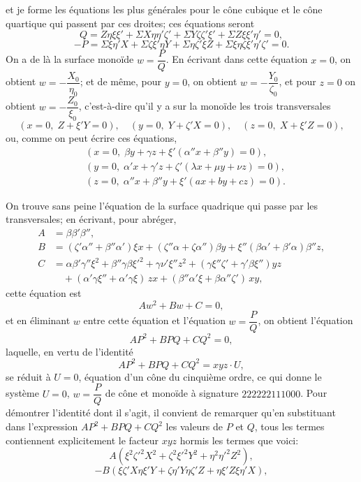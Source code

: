 \documentclass[11pt,a4paper]{article}
\begin{document}
\noindent et je forme les \'{e}quations les plus g\'{e}n\'{e}rales pour le c\^{o}ne cubique et le c\^{o}ne quartique qui passent par ces droites; ces \'{e}quations seront
\[
Q = Z\eta\xi\xi' + \Sigma X\eta\eta'\zeta' + \Sigma Y\zeta\zeta'\xi' + \Sigma Z\xi\xi'\eta' = 0,
\]
\[
-P = \Sigma\xi\eta'X + \Sigma\zeta\xi'\eta Y + \Sigma\eta\zeta'\xi Z + \Sigma\xi\eta\zeta\xi'\eta'\zeta' = 0.
\]
On a de l\`{a} la surface mono\"{i}de $w=\dfrac{P}{Q}$. En \'{e}crivant dans cette \'{e}quation $x=0$, on obtient $w=-\dfrac{X_0}{\eta_0}$; et de m\^{e}me, pour $y=0$, on obtient $w=-\dfrac{Y_0}{\zeta_0}$, et pour $z=0$ on obtient $w=-\dfrac{Z_0}{\xi_0}$, c'est-\`{a}-dire qu'il y a sur la mono\"{i}de les trois transversales
\[
(x=0,\; Z+\xi'Y=0), \quad (y=0,\; Y+\zeta'X=0), \quad (z=0,\; X+\xi'Z=0),
\]
ou, comme on peut \'{e}crire ces \'{e}quations,
\begin{align*}
&(x=0,\; \beta y+\gamma z+\xi'(\alpha''x+\beta''y)=0), \\
&(y=0,\; \alpha'x+\gamma'z+\zeta'(\lambda x+\mu y+\nu z)=0), \\
&(z=0,\; \alpha''x+\beta''y+\xi'(ax+by+cz)=0).
\end{align*}

\medskip

\noindent On trouve sans peine l'\'{e}quation de la surface quadrique qui passe par les transversales; en \'{e}crivant, pour abr\'{e}ger,
\begin{align*}
A &= \beta\beta'\beta'', \\
B &= (\zeta'\alpha''+\beta''\alpha')\xi x+(\zeta''\alpha+\zeta\alpha'')\beta y+\xi''(\beta\alpha'+\beta'\alpha)\beta''z, \\
C &= \alpha\beta'\gamma''\xi^2+\beta''\gamma\beta\xi'^2+\gamma\nu'\xi''z^2+(\gamma\xi''\zeta'+\gamma'\beta\xi'')yz \\
  &\quad +(\alpha'\gamma\xi''+\alpha'\gamma\xi)\,zx+(\beta''\alpha'\xi+\beta\alpha''\zeta')\,xy,
\end{align*}
cette \'{e}quation est
\[
Aw^2+Bw+C=0,
\]
et en \'{e}liminant $w$ entre cette \'{e}quation et l'\'{e}quation $w=\dfrac{P}{Q}$, on obtient l'\'{e}quation
\[
AP^2+BPQ+CQ^2=0,
\]
laquelle, en vertu de l'identit\'{e}
\[
AP^2+BPQ+CQ^2=xyz\cdot U,
\]
se r\'{e}duit \`{a} $U=0$, \'{e}quation d'un c\^{o}ne du cinqui\`{e}me ordre, ce qui donne le syst\`{e}me $U=0$, $w=\dfrac{P}{Q}$ de c\^{o}ne et mono\"{i}de \`{a} signature $222222111000$. Pour d\'{e}montrer l'identit\'{e} dont il s'agit, il convient de remarquer qu'en substituant dans l'expression $AP^2+BPQ+CQ^2$ les valeurs de $P$ et $Q$, tous les termes contiennent explicitement le facteur $xyz$ hormis les termes que voici:
\[
A(\xi^2\zeta'^2X^2+\zeta^2\xi'^2Y^2+\eta^2\eta'^2Z^2),
\]
\[
-B(\xi\zeta'X\eta\xi'Y+\zeta\eta'Y\eta\zeta'Z+\eta\xi'Z\xi\eta'X),
\]
\clearpage
\end{document}
